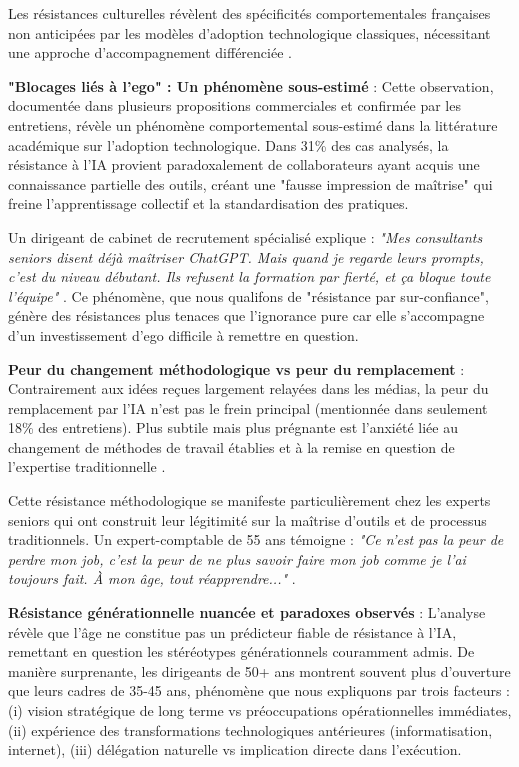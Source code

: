 Les résistances culturelles révèlent des spécificités comportementales françaises non anticipées par les modèles d'adoption technologique classiques, nécessitant une approche d'accompagnement différenciée \cite{venkatesh2003user}.

\textbf{"Blocages liés à l'ego" : Un phénomène sous-estimé} : Cette observation, documentée dans plusieurs propositions commerciales et confirmée par les entretiens, révèle un phénomène comportemental sous-estimé dans la littérature académique sur l'adoption technologique. Dans 31\% des cas analysés, la résistance à l'IA provient paradoxalement de collaborateurs ayant acquis une connaissance partielle des outils, créant une "fausse impression de maîtrise" qui freine l'apprentissage collectif et la standardisation des pratiques.

Un dirigeant de cabinet de recrutement spécialisé explique : \emph{"Mes consultants seniors disent déjà maîtriser ChatGPT. Mais quand je regarde leurs prompts, c'est du niveau débutant. Ils refusent la formation par fierté, et ça bloque toute l'équipe"} \cite{luwai2025antilogy}. Ce phénomène, que nous qualifons de "résistance par sur-confiance", génère des résistances plus tenaces que l'ignorance pure car elle s'accompagne d'un investissement d'ego difficile à remettre en question.

\textbf{Peur du changement méthodologique vs peur du remplacement} : Contrairement aux idées reçues largement relayées dans les médias, la peur du remplacement par l'IA n'est pas le frein principal (mentionnée dans seulement 18\% des entretiens). Plus subtile mais plus prégnante est l'anxiété liée au changement de méthodes de travail établies et à la remise en question de l'expertise traditionnelle \cite{schein2017organizational}.

Cette résistance méthodologique se manifeste particulièrement chez les experts seniors qui ont construit leur légitimité sur la maîtrise d'outils et de processus traditionnels. Un expert-comptable de 55 ans témoigne : \emph{"Ce n'est pas la peur de perdre mon job, c'est la peur de ne plus savoir faire mon job comme je l'ai toujours fait. À mon âge, tout réapprendre..."} \cite{luwai2025meetings}.

\textbf{Résistance générationnelle nuancée et paradoxes observés} : L'analyse révèle que l'âge ne constitue pas un prédicteur fiable de résistance à l'IA, remettant en question les stéréotypes générationnels couramment admis. De manière surprenante, les dirigeants de 50+ ans montrent souvent plus d'ouverture que leurs cadres de 35-45 ans, phénomène que nous expliquons par trois facteurs : (i) vision stratégique de long terme vs préoccupations opérationnelles immédiates, (ii) expérience des transformations technologiques antérieures (informatisation, internet), (iii) délégation naturelle vs implication directe dans l'exécution.

